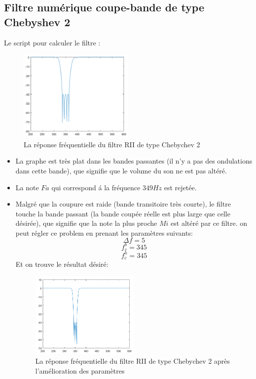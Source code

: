 \documentclass[twoside,twocolumn]{article}
\begin{document}
\subsection{Filtre numérique coupe-bande de type Chebyshev 2}
Le script pour calculer le filtre :
\label{matlab}



\begin{figure}[H]
\centering
\includegraphics[width=0.5\textwidth]{Images/12.png}
\caption{ La réponse fréquentielle du filtre RII de type Chebychev 2}
\end{figure}
\begin{itemize}
\item
La graphe est très plat dans les bandes passantes (il n'y a pas des ondulations dans cette bande), que signifie que le volume du son ne est pas altéré.
\item La note $Fa$ qui correspond á la fréquence $349 Hz$ est rejetée.
\item 
Malgré que la coupure est raide (bande transitoire très courte), le filtre touche la bande passant (la bande coupée réelle est plus large que celle désirée), que signifie que la note la plus proche $Mi$ est altéré par ce filtre. on peut régler ce problem en prenant les paramètres suivants:\\
$$\Delta f = 5$$
$$ f_c^b = 345 $$ 
$$ f_c^h = 345 $$ 
 Et on trouve le résultat désiré:
\begin{figure}[H]
\centering
\includegraphics[width=0.5\textwidth]{Images/14.png}
\caption{ La réponse fréquentielle du filtre RII de type Chebychev 2 après l'amélioration des paramètres}
\end{figure}

\end{itemize}
\end{document}
